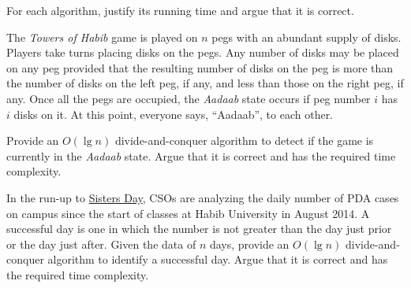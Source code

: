 \documentclass[addpoints]{exam}
\begin{document}
\begin{questions}
  For each algorithm, justify its running time and argue that it is correct.
  
  \begin{solution}
    \begin{parts}
      \part
      \part
    \end{parts}
  \end{solution}
  
  \question[5] The \textit{Towers of Habib} game is played on $n$ pegs with an abundant supply of disks. Players take turns placing disks on the pegs. Any number of disks may be placed on any peg provided that the resulting number of disks on the peg is more than the number of disks on the left peg, if any, and less than those on the right peg, if any. Once all the pegs are occupied, the \textit{Aadaab} state occurs if peg number $i$ has $i$ disks on it. At this point, everyone says, ``Aadaab'', to each other.

  Provide an $O(\lg n)$ divide-and-conquer algorithm to detect if the game is currently in the \textit{Aadaab} state. Argue that it is correct and has the required time complexity.

  \begin{solution}
  \end{solution}

  \question[5] In the run-up to \href{https://en.dailypakistan.com.pk/13-Jan-2019/this-pakistani-varsity-will-celebrate-feb-14-as-sister-s-day}{Sisters Day}, CSOs are analyzing the daily number of PDA cases on campus since the start of classes at Habib University in August 2014. A successful day is one in which the number is not greater than the day just prior or the day just after. Given the data of $n$ days, provide an $O(\lg n)$ divide-and-conquer algorithm to identify a successful day. Argue that it is correct and has the required time complexity.


\end{questions}
\end{document}
